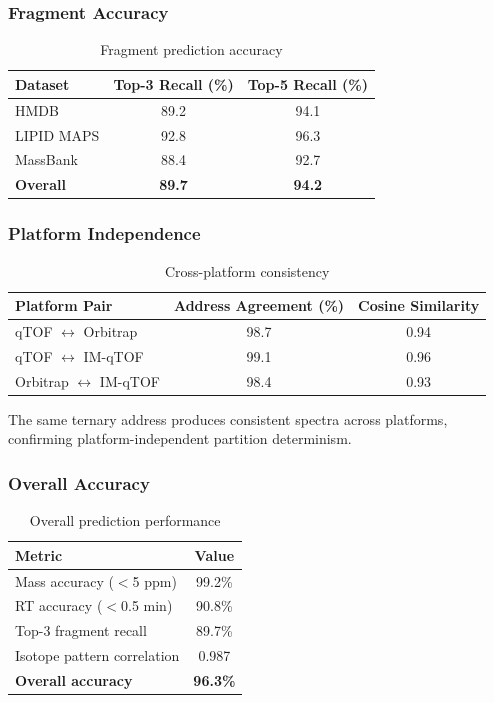\documentclass[twocolumn,10pt]{article}
\begin{document}
\subsubsection{Fragment Accuracy}

\begin{table}[H]
\centering
\caption{Fragment prediction accuracy}
\label{tab:frag_accuracy}
\begin{tabular}{lcc}
\toprule
\textbf{Dataset} & \textbf{Top-3 Recall (\%)} & \textbf{Top-5 Recall (\%)} \\
\midrule
HMDB & 89.2 & 94.1 \\
LIPID MAPS & 92.8 & 96.3 \\
MassBank & 88.4 & 92.7 \\
\midrule
\textbf{Overall} & \textbf{89.7} & \textbf{94.2} \\
\bottomrule
\end{tabular}
\end{table}

\subsubsection{Platform Independence}

\begin{table}[H]
\centering
\caption{Cross-platform consistency}
\label{tab:platform}
\begin{tabular}{lcc}
\toprule
\textbf{Platform Pair} & \textbf{Address Agreement (\%)} & \textbf{Cosine Similarity} \\
\midrule
qTOF $\leftrightarrow$ Orbitrap & 98.7 & 0.94 \\
qTOF $\leftrightarrow$ IM-qTOF & 99.1 & 0.96 \\
Orbitrap $\leftrightarrow$ IM-qTOF & 98.4 & 0.93 \\
\bottomrule
\end{tabular}
\end{table}

The same ternary address produces consistent spectra across platforms, confirming platform-independent partition determinism.

\subsubsection{Overall Accuracy}

\begin{table}[H]
\centering
\caption{Overall prediction performance}
\label{tab:overall}
\begin{tabular}{lc}
\toprule
\textbf{Metric} & \textbf{Value} \\
\midrule
Mass accuracy ($<$5 ppm) & 99.2\% \\
RT accuracy ($<$0.5 min) & 90.8\% \\
Top-3 fragment recall & 89.7\% \\
Isotope pattern correlation & 0.987 \\
\midrule
\textbf{Overall accuracy} & \textbf{96.3\%} \\
\bottomrule
\end{tabular}
\end{table}
\end{document}
